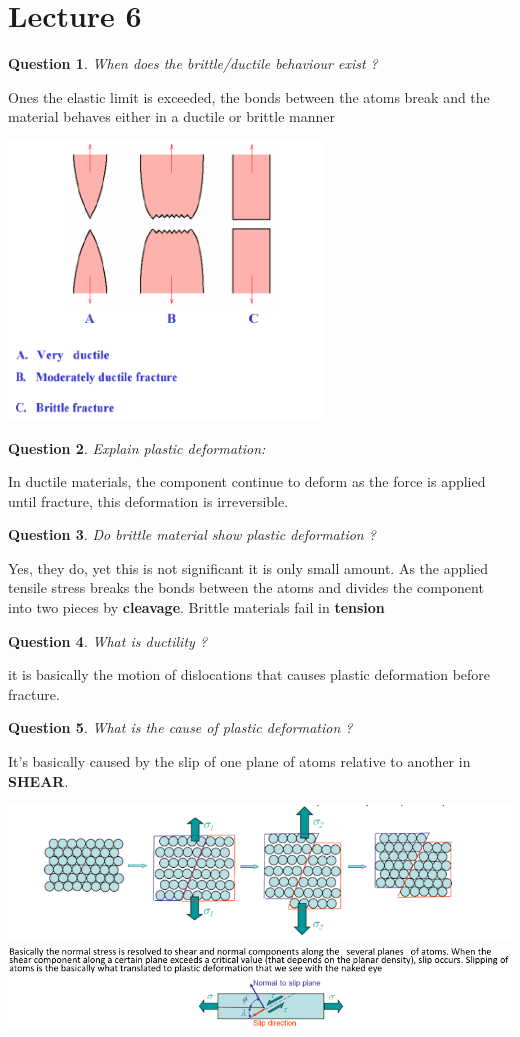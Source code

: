 \documentclass[13]{article}
\newtheorem{exer}{Question}
\begin{document}
\section{Lecture 6}
\begin{exer}
When does the brittle/ductile behaviour exist ?
\end{exer}
Ones the elastic limit is exceeded, the bonds between the atoms break and the material behaves either in a ductile or brittle manner 
\begin{center}
\includegraphics[scale=0.5]{figures/9.png}
\end{center}
\begin{exer}
Explain plastic deformation:
\end{exer}
In ductile materials, the component continue to deform as the force is applied until fracture, this deformation is irreversible.
\begin{exer}
Do brittle material show plastic deformation ?
\end{exer}
Yes, they do, yet this is not significant it is only small amount. As the applied tensile stress breaks the bonds between the atoms and divides the component into two pieces by \textbf{cleavage}. Brittle materials fail in \textbf{tension}  
\begin{exer}
What is ductility ?
\end{exer}
it is basically the motion of dislocations that causes plastic deformation before fracture.
\begin{exer}
What is the cause of plastic deformation ?

\end{exer}
It's basically caused by the slip of one plane of atoms relative to another in \textbf{SHEAR}. 
\begin{center}
\includegraphics[scale=0.5]{figures/10.png} \includegraphics[scale=0.5]{figures/11.png}

\end{center}
\end{document}
